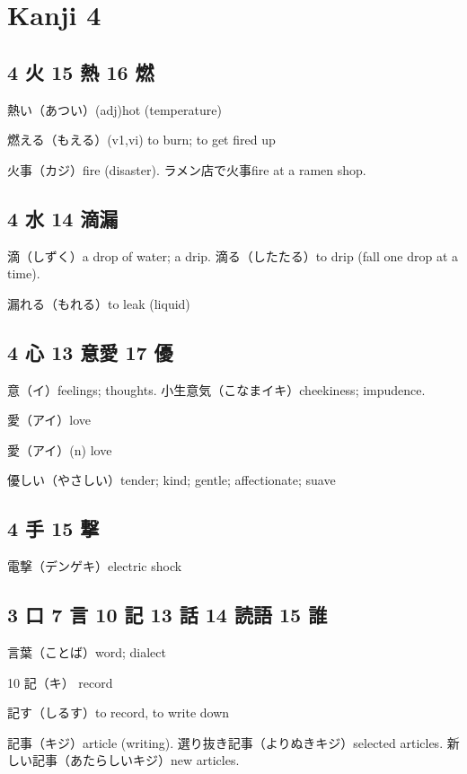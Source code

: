 \chapter{Kanji 4}

\section{4 火 15 熱 16 燃}

熱い（あつい）(adj)hot (temperature)

燃える（もえる）(v1,vi) to burn; to get fired up

火事（カジ）fire (disaster).
ラメン店で火事fire at a ramen shop.

\section{4 水 14 滴漏}

滴（しずく）a drop of water; a drip.
滴る（したたる）to drip (fall one drop at a time).

漏れる（もれる）to leak (liquid)

\section{4 心 13 意愛 17 優}

意（イ）feelings; thoughts.
小生意気（こなまイキ）cheekiness; impudence.

愛（アイ）love

愛（アイ）(n) love

優しい（やさしい）tender; kind; gentle; affectionate; suave

\section{4 手 15 撃}

電撃（デンゲキ）electric shock

\section{3 口 7 言 10 記 13 話 14 読語 15 誰}

言葉（ことば）word; dialect

10 記（キ） record

記す（しるす）to record, to write down

記事（キジ）article (writing).
選り抜き記事（よりぬきキジ）selected articles.
新しい記事（あたらしいキジ）new articles.

